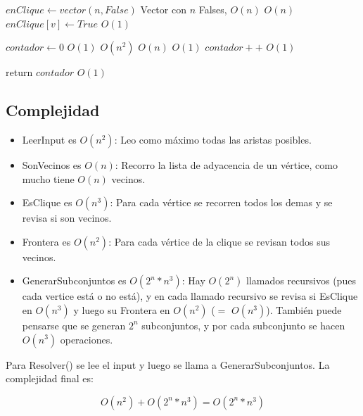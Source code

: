 \begin{algorithm}[H]
\begin{algorithmic}
    \State $enClique \gets vector(n, False)$ \Comment Vector con $n$ Falses, $O(n)$
                        \Comment $O(n)$
        \State $enClique[v] \gets True$      \Comment $O(1)$
    \EndFor

    \State $contador \gets 0$                \Comment $O(1)$
                         \Comment $O(n^2)$
                \Comment $O(n)$
                 \Comment $O(1)$
                \State $contador++$          \Comment $O(1)$
            \EndIf
        \EndFor
    \EndFor

    \State return $contador$                 \Comment $O(1)$

\EndFunction
\end{algorithmic}
\end{algorithm}

\subsection{Complejidad}

\begin{itemize}
    \item LeerInput es $O(n^2)$: Leo como máximo todas las aristas posibles.
    \item SonVecinos es $O(n)$: Recorro la lista de adyacencia de un vértice, como mucho tiene $O(n)$ vecinos.
    \item EsClique es $O(n^{3})$: Para cada vértice se recorren todos los demas y se revisa si son vecinos.
    \item Frontera es $O(n^{2})$: Para cada vértice de la clique se revisan todos sus vecinos.
    \item GenerarSubconjuntos es $O(2^{n} * n^{3})$: Hay $O(2^n)$ llamados recursivos (pues cada vertice está o no está), y en cada llamado recursivo se revisa si EsClique en $O(n^3)$ y luego su Frontera en $O(n^2)$ ($=$ $O(n^3)$). También puede pensarse que se generan $2^n$ subconjuntos, y por cada subconjunto se hacen $O(n^3)$ operaciones.
\end{itemize}

Para Resolver() se lee el input y luego se llama a GenerarSubconjuntos. La complejidad final es:

$$ O(n^2) + O(2^{n} * n^{3}) = O(2^{n} * n^{3})$$

